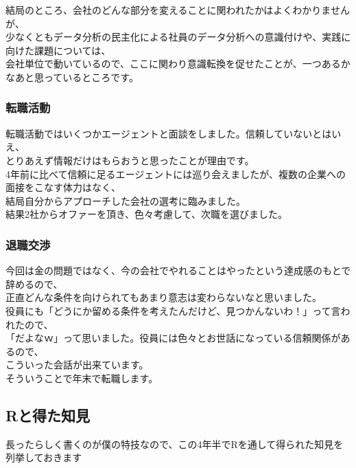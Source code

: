 \documentclass[
  letterpaper,
  DIV=11,
  numbers=noendperiod]{scrartcl}
\begin{document}
結局のところ、会社のどんな部分を変えることに関われたかはよくわかりませんが、\\
少なくともデータ分析の民主化による社員のデータ分析への意識付けや、実践に向けた課題については、\\
会社単位で動いているので、ここに関わり意識転換を促せたことが、一つあるかなあと思っているところです。

\hypertarget{ux8ee2ux8077ux6d3bux52d5}{%
\subsubsection{転職活動}\label{ux8ee2ux8077ux6d3bux52d5}}

転職活動ではいくつかエージェントと面談をしました。信頼していないとはいえ、\\
とりあえず情報だけはもらおうと思ったことが理由です。\\
4年前に比べて信頼に足るエージェントには巡り会えましたが、複数の企業への面接をこなす体力はなく、\\
結局自分からアプローチした会社の選考に臨みました。\\
結果2社からオファーを頂き、色々考慮して、次職を選びました。

\hypertarget{ux9000ux8077ux4ea4ux6e09}{%
\subsubsection{退職交渉}\label{ux9000ux8077ux4ea4ux6e09}}

今回は金の問題ではなく、今の会社でやれることはやったという達成感のもとで辞めるので、\\
正直どんな条件を向けられてもあまり意志は変わらないなと思いました。\\
役員にも「どうにか留める条件を考えたんだけど、見つかんないわ！」って言われたので、\\
「だよなｗ」って思いました。役員には色々とお世話になっている信頼関係があるので、\\
こういった会話が出来ています。\\
そういうことで年末で転職します。

\hypertarget{rux3068ux5f97ux305fux77e5ux898b}{%
\subsection{Rと得た知見}\label{rux3068ux5f97ux305fux77e5ux898b}}

長ったらしく書くのが僕の特技なので、この4年半でRを通して得られた知見を列挙しておきます
\end{document}
